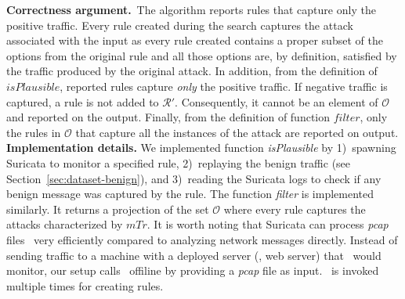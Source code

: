 \documentclass[conference]{IEEEtran}
\begin{document}
\textbf{Correctness argument.}~The algorithm reports rules that
capture only the positive traffic. Every rule created during the
search captures the attack associated with the input as every rule
created contains a proper subset of the options from the original rule
and all those options are, by definition, satisfied by the traffic
produced by the original attack. In addition, from the definition of
$\mathit{isPlausible}$, reported rules capture \emph{only} the
positive traffic. If negative traffic is captured, a rule is not added
to $\mathcal R'$. Consequently, it cannot be an element of $\mathcal
O$ and reported on the output. Finally, from the definition of
function $\mathit{filter}$, only the rules in $\mathcal O$ that
capture all the instances of the attack are reported on output.
\textbf{Implementation details.} We implemented function
\emph{isPlausible} by 1)~spawning Suricata to monitor a specified
rule, 2)~replaying the benign traffic (see
Section~\ref{sec:dataset-benign}), and 3)~reading the Suricata logs to
check if any benign message was captured by the rule. The function
\emph{filter} is implemented similarly. It returns a projection of the
set $\mathcal O$ where every rule captures the attacks characterized
by $\mathit{mTr}$. It is worth noting that Suricata can process
\emph{pcap} files~\cite{pcap} very efficiently compared to analyzing
network messages directly. Instead of sending traffic to a machine
with a deployed server (\eg{}, web server) that \suri\ would monitor,
our setup calls \suri\ offiline by providing a \emph{pcap} file as input. \suri\ is invoked
multiple times for creating rules.




\end{document}
